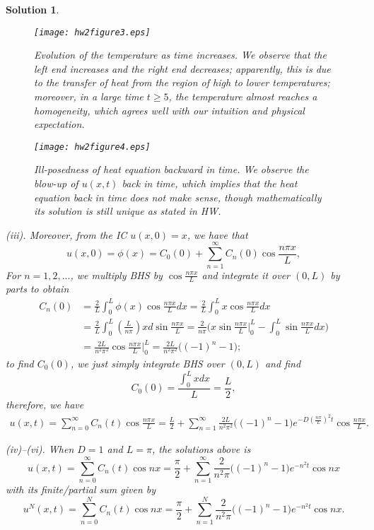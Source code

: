 \documentclass[6pt]{article}
\newtheorem{solution}{Solution}
\numberwithin{equation}{section}
\begin{document}
\begin{enumerate}
\begin{solution}
\begin{figure}[h!]%
  \centering
  \texttt{[image: hw2figure3.eps]}\\
  \caption{Evolution of the temperature as time increases.  We observe that the left end increases and the right end decreases; apparently, this is due to the transfer of heat from the region of high to lower temperatures; moreover, in a large time $t\geq5$, the temperature almost reaches a homogeneity, which agrees well with our intuition and physical expectation.}\label{figure2}
\end{figure}

\begin{figure}[h!]%
  \centering
  \texttt{[image: hw2figure4.eps]}\\
  \caption{Ill-posedness of heat equation backward in time.  We observe the blow-up of $u(x,t)$ back in time, which implies that the heat equation back in time does not make sense, though mathematically its solution is still unique as stated in HW.}\label{figure3}
\end{figure}

(iii).  Moreover, from the IC $u(x,0)=x$, we have that
\[u(x,0)=\phi(x)=C_{0}(0)+\sum_{n=1}^{\infty}C_{n}(0)\cos{\frac{n\pi x}{L}},\]
For $n=1,2,...$, we multiply BHS by $\cos \frac{n\pi x}{L}$ and integrate it over $(0,L)$ by parts to obtain
\begin{align*}
C_n(0)&=\frac{2}{L}\int_{0}^{L}\phi(x)\cos{\frac{n\pi x}{L}}dx=\frac{2}{L}\int_{0}^{L}x\cos{\frac{n\pi x}{L}}dx\\
&=\frac{2}{L}\int_{0}^{L}(\frac{L}{n\pi})xd\sin{\frac{n\pi x}{L}}=\frac{2}{n\pi}\Big(x\sin{\frac{n\pi x}{L}}\Big\vert^{L}_{0}-\int_{0}^{L}\sin{\frac{n\pi x}{L}}dx\Big)\\
&=\frac{2L}{n^2\pi^2}\cos{\frac{n\pi x}{L}}\Big\vert_0^L=\frac{2L}{n^2\pi^2}\Big((-1)^n-1\Big);
\end{align*}
to find $C_0(0)$, we just simply integrate BHS over $(0,L)$ and find
\[C_0(0)=\frac{\int_{0}^Lxdx}{L}=\frac{L}{2},\]
therefore, we have
\begin{align*}
u(x,t)=\sum_{n=0}^{\infty}C_{n}(t)\cos{\frac{n\pi x}{L}}=\frac{L}{2}+\sum_{n=1}^{\infty}\frac{2L}{n^2\pi^2}\Big((-1)^n-1\Big)e^{-D(\frac{n\pi}{L})^{2}t}\cos{\frac{n\pi x}{L}}.
\end{align*}

(iv)--(vi).
When $D=1$ and $L=\pi$, the solutions above is
\[u(x,t)=\sum_{n=0}^{\infty}C_{n}(t)\cos nx=\frac{\pi}{2}+\sum_{n=1}^{\infty}\frac{2}{n^2\pi}\Big((-1)^n-1\Big)e^{-n^{2}t}\cos nx\]
with its finite/partial sum given by
\[u^N(x,t)=\sum_{n=0}^NC_{n}(t)\cos nx=\frac{\pi}{2}+\sum_{n=1}^N\frac{2}{n^2\pi}\Big((-1)^n-1\Big)e^{-n^{2}t}\cos nx.\]


\end{solution}
\end{enumerate}
\end{document}
